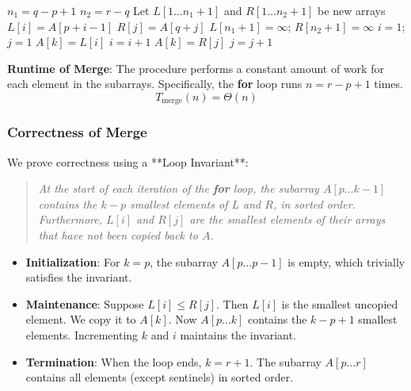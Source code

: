 \documentclass[12pt]{article}
\theoremstyle{blueplain}
\theoremstyle{bluedef}
\theoremstyle{blueremark}
\begin{document}
\begin{algorithm}
    \caption{Merge Procedure}\label{alg:merge}
    \begin{algorithmic}[1]
        \State $n_1 = q - p + 1$
        \State $n_2 = r - q$
        \State Let $L[1 \dots n_1+1]$ and $R[1 \dots n_2+1]$ be new arrays
        \State $L[i] = A[p + i - 1]$
        \EndFor
        \State $R[j] = A[q + j]$
        \EndFor
        \State $L[n_1 + 1] = \infty$; $R[n_2 + 1] = \infty$ 
        \State $i = 1$; $j = 1$
        \State $A[k] = L[i]$
        \State $i = i + 1$
        \Else
        \State $A[k] = R[j]$
        \State $j = j + 1$
        \EndIf
        \EndFor
        \EndProcedure
    \end{algorithmic}
\end{algorithm}

\noindent \textbf{Runtime of Merge}:
The procedure performs a constant amount of work for each element in the subarrays. Specifically, the \textbf{for} loop runs $n = r - p + 1$ times.
\[ T_{\text{merge}}(n) = \Theta(n) \]


\subsubsection{Correctness of Merge}
We prove correctness using a **Loop Invariant**:
\begin{quote}
    \textit{At the start of each iteration of the \textbf{for} loop, the subarray $A[p \dots k-1]$ contains the $k-p$ smallest elements of $L$ and $R$, in sorted order. Furthermore, $L[i]$ and $R[j]$ are the smallest elements of their arrays that have not been copied back to $A$.}
\end{quote}
\begin{itemize}
    \item \textbf{Initialization}: For $k=p$, the subarray $A[p \dots p-1]$ is empty, which trivially satisfies the invariant.
    \item \textbf{Maintenance}: Suppose $L[i] \le R[j]$. Then $L[i]$ is the smallest uncopied element. We copy it to $A[k]$. Now $A[p \dots k]$ contains the $k-p+1$ smallest elements. Incrementing $k$ and $i$ maintains the invariant.
    \item \textbf{Termination}: When the loop ends, $k=r+1$. The subarray $A[p \dots r]$ contains all elements (except sentinels) in sorted order.
\end{itemize}
\end{document}
